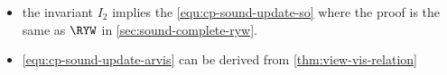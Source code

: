 \begin{itemize}
\item the invariant \( I_2 \) implies the \cref{equ:cp-sound-update-so} where the proof is the same as \( \RYW \) in \cref{sec:sound-complete-ryw}.

\item \cref{equ:cp-sound-update-arvis} can be derived from \cref{thm:view-vis-relation}

\end{itemize}
